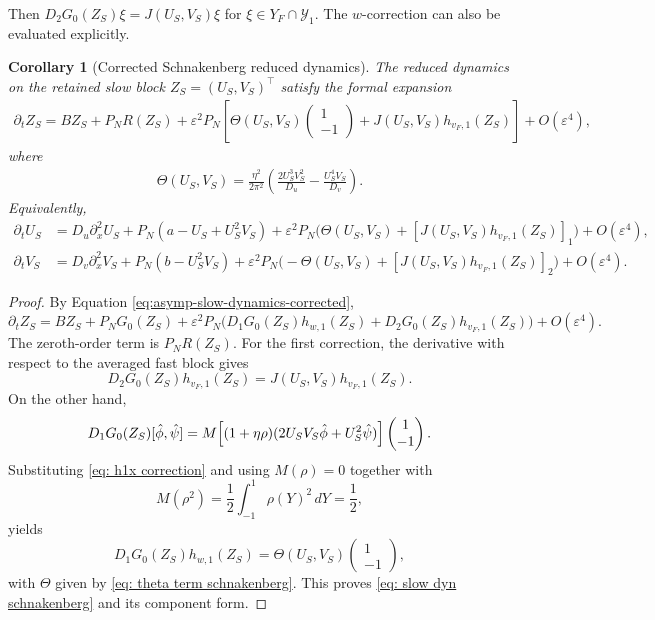 \documentclass[11pt]{article}
\newtheorem{corollary}[theorem]{Corollary}
\theoremstyle{definition}
\theoremstyle{remark}
\numberwithin{equation}{section}
\newcommand{\mc}[1]{\mathcal{#1}}
\begin{document}
Then \(D_2G_0(Z_S)\xi = J(U_S,V_S)\xi\) for \(\xi \in Y_F \cap \mc Y_1\). The \(w\)-correction can also be evaluated explicitly.
\begin{corollary}[Corrected Schnakenberg reduced dynamics] \label{cor: schnakenberg 2}
  The reduced dynamics on the retained slow block \(Z_S=(U_S,V_S)^\top\) satisfy the formal expansion
  \begin{align}\label{eq: slow dyn schnakenberg}
      \partial_t Z_S=BZ_S + P_NR(Z_S)+ \varepsilon^2 P_N \left[\Theta(U_S,V_S)
    \begin{pmatrix}
    1\\-1\end{pmatrix}
    + J(U_S,V_S)h_{v_F,1}(Z_S) \right] + O(\varepsilon^4),
  \end{align}
   where
   \begin{align}\label{eq: theta term schnakenberg}
      \Theta(U_S,V_S)=\frac{\eta^2}{2\pi^2} \left(\frac{2U_S^3V_S^2}{D_u} -\frac{U_S^4V_S}{D_v}\right).
   \end{align}
Equivalently,
\begin{align*}
  \partial_t U_S
&=
D_u\partial_x^2 U_S
+ P_N(a-U_S+U_S^2V_S)
+ \varepsilon^2 P_N\bigl(\Theta(U_S,V_S)+[J(U_S,V_S)h_{v_F,1}(Z_S)]_1\bigr)
+ O(\varepsilon^4),  \\
\partial_t V_S
&=
D_v\partial_x^2 V_S
+ P_N(b-U_S^2V_S)
+ \varepsilon^2 P_N\bigl(-\Theta(U_S,V_S)+[J(U_S,V_S)h_{v_F,1}(Z_S)]_2\bigr)
+ O(\varepsilon^4).
\end{align*}
\end{corollary}

\begin{proof}
By Equation \eqref{eq:asymp-slow-dynamics-corrected},
\[
\partial_t Z_S
=
BZ_S + P_NG_0(Z_S)
+ \varepsilon^2 P_N\bigl(D_1G_0(Z_S)h_{w,1}(Z_S)+D_2G_0(Z_S)h_{v_F,1}(Z_S)\bigr)
+ O(\varepsilon^4).
\]
The zeroth-order term is \(P_NR(Z_S)\). For the first correction, the derivative with respect to the averaged fast block gives
\[
D_2G_0(Z_S)h_{v_F,1}(Z_S)=J(U_S,V_S)h_{v_F,1}(Z_S).
\]
On the other hand,
\[
D_1G_0(Z_S)[\hat{\phi},\hat{\psi}]
=
M\Bigl[(1+\eta\rho)(2U_SV_S\hat{\phi}+U_S^2\hat{\psi})\Bigr]
\begin{pmatrix}
1\\
-1
\end{pmatrix}.
\]
Substituting \eqref{eq: h1x correction} and using \(M(\rho)=0\) together with
\[
M(\rho^2)=\frac12\int_{-1}^1 \rho(Y)^2\,dY=\frac12,
\]
yields
\[
D_1G_0(Z_S)h_{w,1}(Z_S)
=
\Theta(U_S,V_S)
\begin{pmatrix}
1\\
-1
\end{pmatrix},
\]
with \(\Theta\) given by \eqref{eq: theta term schnakenberg}. This proves \eqref{eq: slow dyn schnakenberg} and its component form.
\end{proof}
\end{document}
